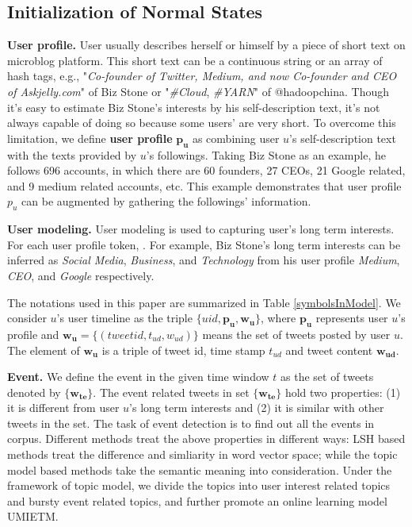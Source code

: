 \documentclass[conference,compsoc]{IEEEtran}
\begin{document}
\subsection{Initialization of Normal States}
\textbf{User profile.} User usually describes herself or himself by a piece of short text on microblog platform.
This short text can be a continuous string or an array of hash tags, e.g., "\textit{Co-founder of Twitter, Medium, and now Co-founder and CEO of Askjelly.com}" of Biz Stone or "\textit{\#Cloud}, \textit{\#YARN}" of @hadoopchina.
Though it's easy to estimate Biz Stone's interests by his self-description text, it's not always capable of doing so because some users' are very short.
To overcome this limitation, we define \textbf{user profile} \(\bm{p_u}\) as combining user \(u\)'s self-description text with the texts provided by \(u\)'s followings. 
Taking Biz Stone as an example, he follows 696 accounts, in which there are 60 founders, 27 CEOs, 21 Google related, and 9 medium related accounts, etc. 
This example demonstrates that user profile \(p_u\) can be augmented by gathering the followings' information.

\textbf{User modeling.} 
User modeling is used to capturing user's long term interests. 
For each user profile token, .
For example, Biz Stone's long term interests can be inferred as \textit{Social Media}, \textit{Business}, and \textit{Technology} from his user profile \textit{Medium}, \textit{CEO}, and \textit{Google} respectively.

The notations used in this paper are summarized in Table \ref{symbolsInModel}.
We consider \(u\)'s user timeline as  the triple \(\{uid, \bm{p_u},\bm{w_u}\} \), where \(\bm{p_u}\) represents user \(u\)'s profile and \(\bm{w_u}=\{(tweetid, t_{ud},w_{ud})\}\) means the set of tweets posted by user \(u\).
The element of \(\bm{w_u}\) is a triple of tweet id, time stamp \(t_{ud}\) and tweet content \(\bm{w_{ud}}\).



\textbf{Event.} We define the event in the given time window \(t\) as the set of tweets denoted by \( \{ \bm{w_{te}}\}\).
The event related tweets in set \( \{ \bm{w_{te}}\}\)  hold two properties: (1) it is different from user \(u\)'s long term interests and (2) it is similar with other tweets in the set.
The task of event detection is to find out all the events in corpus.
Different methods treat the above properties in different ways: LSH based methods\cite{petrovic2010streaming} treat the difference and simliarity in word vector space; while the topic model based methods\cite{timeUserLDA2012finding} take the semantic meaning into consideration.
Under the framework of topic model, we divide the topics into user interest related topics and bursty event related topics, and further promote an online learning model UMIETM.
\end{document}
